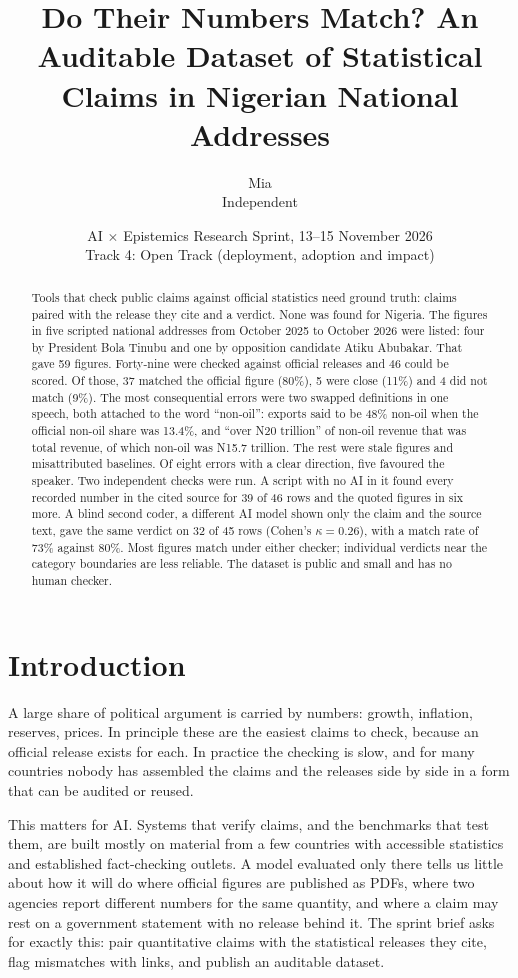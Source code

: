 \documentclass[11pt]{article}
\title{\textbf{Do Their Numbers Match? An Auditable Dataset of Statistical Claims in Nigerian National Addresses}}
\author{Mia\\ \small Independent}
\date{\small AI $\times$ Epistemics Research Sprint, 13--15 November 2026\\ Track 4: Open Track (deployment, adoption and impact)}
\newcommand{\N}{N}
\begin{document}
\maketitle
\vspace{-1.2em}

\begin{abstract}
\noindent
Tools that check public claims against official statistics need ground truth: claims paired with the release they cite and a verdict. None was found for Nigeria. The figures in five scripted national addresses from October 2025 to October 2026 were listed: four by President Bola Tinubu and one by opposition candidate Atiku Abubakar. That gave 59 figures. Forty-nine were checked against official releases and 46 could be scored. Of those, 37 matched the official figure (80\%), 5 were close (11\%) and 4 did not match (9\%). The most consequential errors were two swapped definitions in one speech, both attached to the word ``non-oil'': exports said to be 48\% non-oil when the official non-oil share was 13.4\%, and ``over \N 20 trillion'' of non-oil revenue that was total revenue, of which non-oil was \N 15.7 trillion. The rest were stale figures and misattributed baselines. Of eight errors with a clear direction, five favoured the speaker. Two independent checks were run. A script with no AI in it found every recorded number in the cited source for 39 of 46 rows and the quoted figures in six more. A blind second coder, a different AI model shown only the claim and the source text, gave the same verdict on 32 of 45 rows (Cohen's $\kappa = 0.26$), with a match rate of 73\% against 80\%. Most figures match under either checker; individual verdicts near the category boundaries are less reliable. The dataset is public and small and has no human checker.
\end{abstract}

\section{Introduction}

A large share of political argument is carried by numbers: growth, inflation, reserves, prices. In principle these are the easiest claims to check, because an official release exists for each. In practice the checking is slow, and for many countries nobody has assembled the claims and the releases side by side in a form that can be audited or reused.

This matters for AI. Systems that verify claims, and the benchmarks that test them, are built mostly on material from a few countries with accessible statistics and established fact-checking outlets. A model evaluated only there tells us little about how it will do where official figures are published as PDFs, where two agencies report different numbers for the same quantity, and where a claim may rest on a government statement with no release behind it. The sprint brief asks for exactly this: pair quantitative claims with the statistical releases they cite, flag mismatches with links, and publish an auditable dataset.
\end{document}
